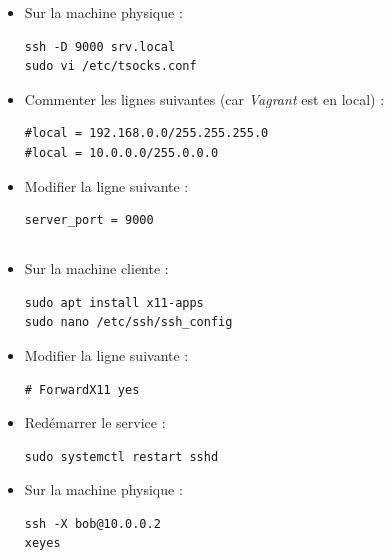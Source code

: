 \documentclass{article}
\begin{document}
\begin{itemize}
\item Sur la machine physique :
\begin{lstlisting}
ssh -D 9000 srv.local
sudo vi /etc/tsocks.conf
\end{lstlisting}
\item Commenter les lignes suivantes (car \emph{Vagrant} est en local) :
\begin{lstlisting}
#local = 192.168.0.0/255.255.255.0
#local = 10.0.0.0/255.0.0.0
\end{lstlisting}
\item Modifier la ligne suivante :
\begin{lstlisting}
server_port = 9000
\end{lstlisting}
\end{itemize}

\subsection{}

\begin{itemize}
\item Sur la machine cliente :
\begin{lstlisting}
sudo apt install x11-apps
sudo nano /etc/ssh/ssh_config
\end{lstlisting}
\item Modifier la ligne suivante :
\begin{lstlisting}
# ForwardX11 yes
\end{lstlisting}
\item Redémarrer le service :
\begin{lstlisting}
sudo systemctl restart sshd
\end{lstlisting}
\item Sur la machine physique :
\begin{lstlisting}
ssh -X bob@10.0.0.2
xeyes
\end{lstlisting}
\end{itemize}

\subsection{}
\end{document}
